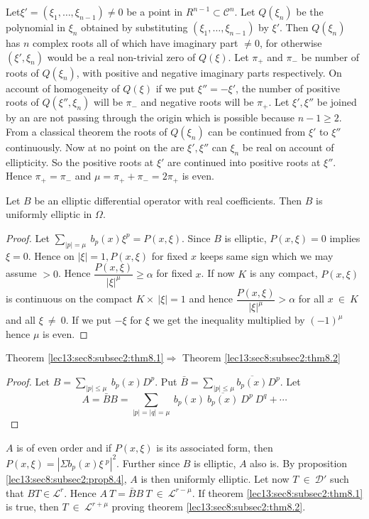 Let\pageoriginale $\xi' = (\xi_1,\ldots,\xi_{n-1}) \neq 0$ be a point in $R^{n-1}
\subset \mathscr{C}^n$. Let $Q(\xi_n)$ be the polynomial in $\xi_n$
obtained by substituting $(\xi_1,\ldots, \xi_{n-1})$ by $\xi'$. Then
$Q(\xi_n)$ has $n$ complex roots all of which have imaginary part
$\neq 0$, for otherwise $(\xi', \xi_n)$ would be a real non-trivial
zero of $Q(\xi)$. Let $\pi_+$ and $\pi_-$ be number of roots of
$Q(\xi_n)$, with positive and negative imaginary parts
respectively. On account of homogeneity of $Q(\xi)$ if we put $\xi'' =
- \xi'$, the number of positive roots of $Q(\xi'', \xi_n)$ will be
$\pi_-$ and negative roots will be $\pi_+$.  Let $\xi', \xi''$ be
joined by an are not passing through the origin which is possible
because $n-1 \ge 2 $. From a classical theorem the roots of $Q(\xi_n)$
can be continued from $\xi'$ to $\xi''$ continuously.  Now at no point
on the are $\xi', \xi''$ can $\xi_n$ be real on account of
ellipticity. So the positive roots at $\xi'$ are continued into
positive roots at $\xi''$. Hence $\pi_+ = \pi_-$ and $\mu = \pi_+ +
\pi_- = 2 \pi_+$ is even. 

\begin{proposition}\label{lec13:sec8:subsec2:prop8.4}%
  Let $B$ be an elliptic differential operator with real
  coefficients. Then $B$ is uniformly elliptic in $\Omega$. 
\end{proposition}

\begin{proof}
  Let $\sum\limits_{|p| = \mu} ~ b_p (x) \xi^p = P (x,\xi)$. Since $B$
  is elliptic, $P(x,\xi) = 0$ implies $\xi = 0$. Hence on $|\xi| = 1,
  P(x,\xi)$ for fixed $x$ keeps same sign which we may assume $>
  0$. Hence $\dfrac{P(x,\xi)}{|\xi|^\mu} \ge \alpha$ for fixed $x$. If
  now $K$ is any compact, $P(x,\xi)$ is continuous on the compact $K  \times
  ~ |\xi | = 1$ and hence $\dfrac{P(x,\xi)}{|\xi|^\mu} > \alpha$ for
  all $x ~ \in ~ K$ and all $\xi ~ \neq ~ 0$. If we put $-\xi$
  for $\xi$ we get the inequality multiplied by $(-1)^\mu$ hence $\mu$
  is even. 
\end{proof}

\begin{proposition}\label{lec13:sec8:subsec2:prop8.5}%
  Theorem \ref{lec13:sec8:subsec2:thm8.1}\pageoriginale $\Rightarrow$ Theorem \ref{lec13:sec8:subsec2:thm8.2}
\end{proposition}

\begin{proof}%
  Let $B = \sum\limits_{|p|\le \mu} ~ b_p (x) D^p$. Put $\bar{B} =
  \sum\limits_{|p|\le \mu} \overline{b_p(x)}D^p$. Let  
  $$
  A = \bar{B}B = \sum_{|p| = |q|=\mu} ~ b_p(x)~ \overline{b_p(x)} ~ D^p
  ~ D^q + \cdots 
  $$
\end{proof}

$A$ is of even order and if $P(x,\xi)$ is its associated form, then
$P(x,\xi) = | \Sigma b_p(x) \xi~ ^{p}|^2$. Further since $B$ is
elliptic, $A$ also is. By proposition \ref{lec13:sec8:subsec2:prop8.4}, $A$ is  then uniformly
elliptic. Let now $T ~ \in ~ \mathscr{D}'$ such that $BT
\in \mathscr{L}^r$. Hence $A~ T = \bar{B} B ~ T ~ \in
~ \mathscr{L}^{r-\mu}$. If theorem \ref{lec13:sec8:subsec2:thm8.1} is true, then $T ~
\in ~ \mathscr{L}^{r+\mu}$ proving theorem \ref{lec13:sec8:subsec2:thm8.2}. 
